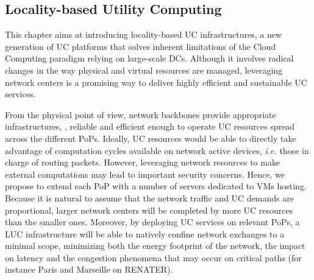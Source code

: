 
\subsection{Locality-based Utility Computing}



This chapter aims at introducing locality-based UC infrastructures, a new generation of UC
platforms that solves inherent limitations of the Cloud Computing paradigm relying on
large-scale DCs. Although it involves radical changes in the way physical and virtual
resources are managed, leveraging network centers is a promising way to deliver highly
efficient and sustainable UC services.

From the physical point of view, network backbones 
provide appropriate infrastructures, \ie, reliable and efficient enough to operate UC
resources spread across the different PoPs. Ideally, UC resources would be able to
directly take advantage of computation cycles available on network active devices,
\textit{i.e.} those in charge of routing packets. However, leveraging network resources to
make external computations may lead to important security concerns. Hence, we propose to
extend each PoP with a number of servers dedicated to VMs hosting. Because it is natural
to assume that the network traffic and UC demands are proportional, larger network centers
will be completed by more UC resources than the smaller ones. Moreover, by deploying UC
services on relevant PoPs, a LUC infrastructure will be able to natively confine network
exchanges to a minimal scope, minimizing both the energy footprint of the network, the
impact on latency and the congestion phenomena that may occur on critical paths (for
instance Paris and Marseille on RENATER).

